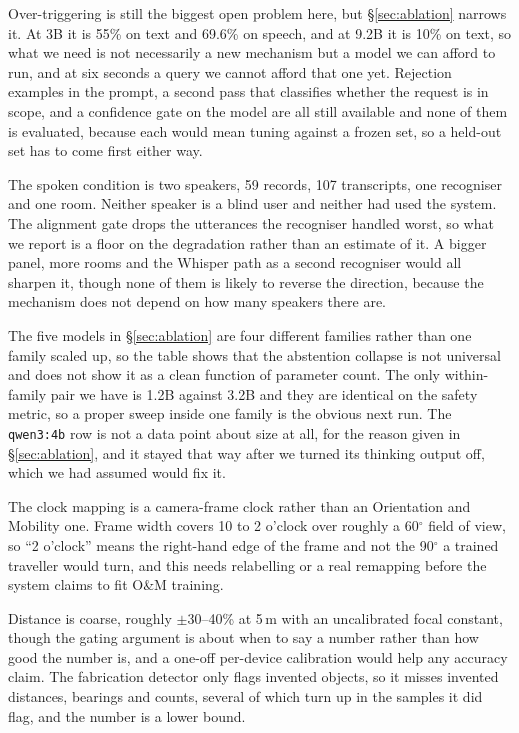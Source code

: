 \documentclass[sigconf,nonacm]{acmart}
\newcommand{\tool}[1]{\texttt{#1}}
\begin{document}
Over-triggering is still the biggest open problem here, but \S\ref{sec:ablation}
narrows it. At 3B it is 55\% on text and 69.6\% on speech, and at 9.2B it is
10\% on text, so what we need is not necessarily a new mechanism but a model we
can afford to run, and at six seconds a query we cannot afford that one yet.
Rejection examples in the prompt, a second pass that classifies whether the
request is in scope, and a confidence gate on the model
\cite{hendrycks2017baseline} are all still available and none of them is
evaluated, because each would mean tuning against a frozen set, so a held-out set
has to come first either way.

The spoken condition is two speakers, 59 records, 107 transcripts, one
recogniser and one room. Neither speaker is a blind user and neither had used
the system. The alignment gate drops the utterances the recogniser handled
worst, so what we report is a floor on the degradation rather than an estimate
of it. A bigger panel, more rooms and the Whisper path as a second recogniser
would all sharpen it, though none of them is likely to reverse the direction,
because the mechanism does not depend on how many speakers there are.

The five models in \S\ref{sec:ablation} are four different families rather than
one family scaled up, so the table shows that the abstention collapse is not
universal and does not show it as a clean function of parameter count. The only
within-family pair we have is 1.2B against 3.2B and they are identical on the
safety metric, so a proper sweep inside one family is the obvious next run. The
\tool{qwen3:4b} row is not a data point about size at all, for the reason given
in \S\ref{sec:ablation}, and it stayed that way after we turned its thinking
output off, which we had assumed would fix it.

The clock mapping is a camera-frame clock rather than an Orientation and
Mobility one. Frame width covers 10 to 2 o'clock over roughly a 60$^\circ$ field
of view, so ``2 o'clock'' means the right-hand edge of the frame and not the
90$^\circ$ a trained traveller would turn, and this needs relabelling or a real
remapping before the system claims to fit O\&M training.

Distance is coarse, roughly $\pm$30--40\% at 5\,m with an uncalibrated focal
constant, though the gating argument is about when to say a number rather than
how good the number is, and a one-off per-device calibration would help any
accuracy claim. The fabrication detector only flags invented objects, so it
misses invented distances, bearings and counts, several of which turn up in the
samples it did flag, and the number is a lower bound.
\end{document}
